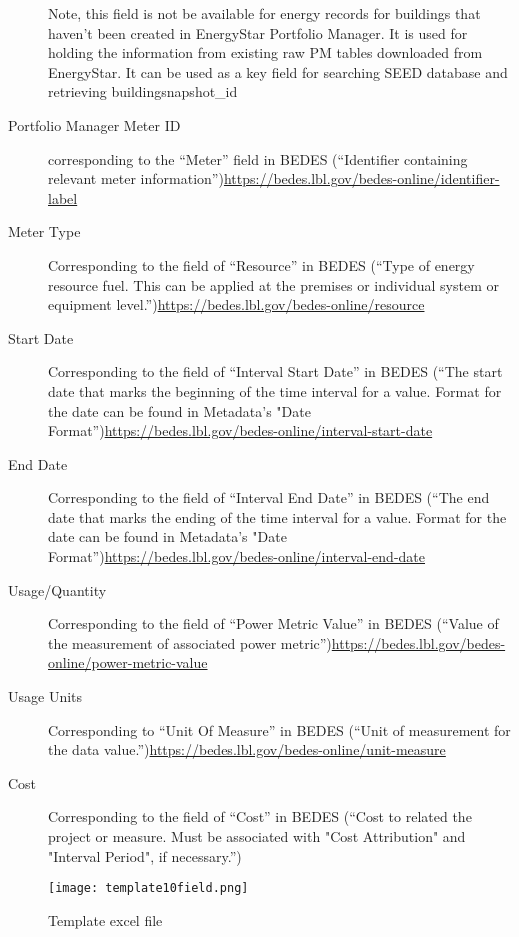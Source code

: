 \documentclass[12pt]{article}
\begin{document}
\begin{description}
  Note, this field is not be available for energy records for
  buildings that haven't been created in EnergyStar Portfolio
  Manager. It is used for holding the information from existing raw PM
  tables downloaded from EnergyStar. It can be used as a key field for
  searching SEED database and retrieving buildingsnapshot\_id
\item[Portfolio Manager Meter ID] corresponding to the ``Meter'' field
  in BEDES (``Identifier containing relevant meter
  information'')\url{https://bedes.lbl.gov/bedes-online/identifier-label}
\item[Meter Type] Corresponding to the field of ``Resource'' in BEDES
  (``Type of energy resource fuel. This can be applied at the premises
  or individual system or equipment
  level.'')\url{https://bedes.lbl.gov/bedes-online/resource}
\item[Start Date] Corresponding to the field of ``Interval Start
  Date'' in BEDES (``The start date that marks the beginning of the
  time interval for a value. Format for the date can be found in
  Metadata's "Date
  Format'')\url{https://bedes.lbl.gov/bedes-online/interval-start-date}
\item[End Date] Corresponding to the field of ``Interval End Date'' in
  BEDES (``The end date that marks the ending of the time interval for
  a value. Format for the date can be found in Metadata's "Date
  Format'')\url{https://bedes.lbl.gov/bedes-online/interval-end-date}
\item[Usage/Quantity] Corresponding to the field of ``Power Metric
  Value'' in BEDES (``Value of the measurement of associated power
  metric'')\url{https://bedes.lbl.gov/bedes-online/power-metric-value}
\item[Usage Units] Corresponding to ``Unit Of Measure'' in BEDES
  (``Unit of measurement for the data
  value.'')\url{https://bedes.lbl.gov/bedes-online/unit-measure}
\item[Cost] Corresponding to the field of ``Cost'' in BEDES (``Cost to
  related the project or measure. Must be associated with "Cost
  Attribution" and "Interval Period", if necessary.'')
\end{description}

\begin{figure}[h!]
  \centering
  \texttt{[image: template10field.png]}
  \caption{Template excel file}
  \label{fig:template10field}
\end{figure}
\end{document}
